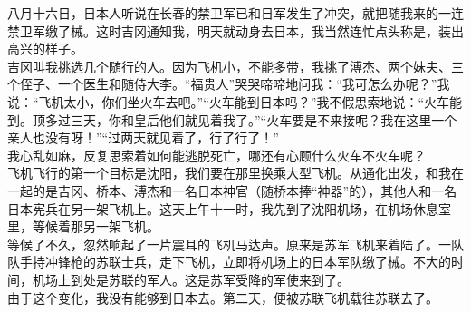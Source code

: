 八月十六日，日本人听说在长春的禁卫军已和日军发生了冲突，就把随我来的一连禁卫军缴了械。这时吉冈通知我，明天就动身去日本，我当然连忙点头称是，装出高兴的样子。\\

吉冈叫我挑选几个随行的人。因为飞机小，不能多带，我挑了溥杰、两个妹夫、三个侄子、一个医生和随侍大李。“福贵人”哭哭啼啼地问我：“我可怎么办呢？”我说：“飞机太小，你们坐火车去吧。”“火车能到日本吗？”我不假思索地说：“火车能到。顶多过三天，你和皇后他们就见着我了。”“火车要是不来接呢？我在这里一个亲人也没有呀！”“过两天就见着了，行了行了！”\\

我心乱如麻，反复思索着如何能逃脱死亡，哪还有心顾什么火车不火车呢？\\

飞机飞行的第一个目标是沈阳，我们要在那里换乘大型飞机。从通化出发，和我在一起的是吉冈、桥本、溥杰和一名日本神官（随桥本捧“神器”的），其他人和一名日本宪兵在另一架飞机上。这天上午十一时，我先到了沈阳机场，在机场休息室里，等候着那另一架飞机。\\

等候了不久，忽然响起了一片震耳的飞机马达声。原来是苏军飞机来着陆了。一队队手持冲锋枪的苏联士兵，走下飞机，立即将机场上的日本军队缴了械。不大的时间，机场上到处是苏联的军人。这是苏军受降的军使来到了。\\

由于这个变化，我没有能够到日本去。第二天，便被苏联飞机载往苏联去了。